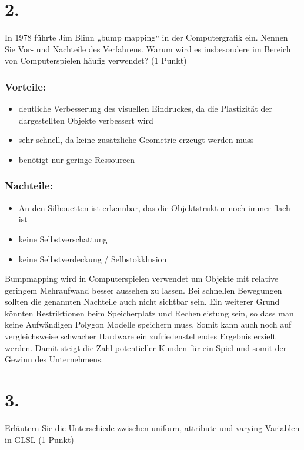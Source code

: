 \documentclass[12pt]{scrreprt}
\begin{document}
\section*{2.}
In 1978 führte Jim Blinn „bump mapping“ in der Computergrafik ein. Nennen Sie Vor- und Nachteile des Verfahrens. Warum wird es insbesondere im Bereich von Computerspielen häufig verwendet? (1 Punkt)

\subsubsection*{Vorteile:}

\begin{itemize}
  \item deutliche Verbesserung des visuellen Eindruckes, da die
    Plastizität der dargestellten Objekte verbessert wird
  \item sehr schnell, da keine zusätzliche Geometrie erzeugt werden muss
  \item benötigt nur geringe Ressourcen
\end{itemize}

\subsubsection*{Nachteile:}

\begin{itemize}
  \item An den Silhouetten ist erkennbar, das die Objektstruktur noch immer flach ist
  \item keine Selbstverschattung
  \item keine Selbstverdeckung / Selbstokklusion
\end{itemize}


Bumpmapping wird in Computerspielen verwendet um Objekte mit relative geringem Mehraufwand besser aussehen zu lassen. Bei schnellen Bewegungen sollten die genannten Nachteile auch nicht sichtbar sein.
Ein weiterer Grund könnten Restriktionen beim Speicherplatz und Rechenleistung sein, so dass man keine Aufwändigen Polygon Modelle speichern muss. Somit kann auch noch auf vergleichsweise schwacher Hardware ein
zufriedenstellendes Ergebnis erzielt werden. Damit steigt die Zahl
potentieller Kunden für ein Spiel und somit der Gewinn des Unternehmens.


\section*{3.}
Erläutern Sie die Unterschiede zwischen uniform, attribute und varying Variablen in GLSL (1 Punkt)
\end{document}
